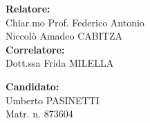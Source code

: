 \begin{titlepage}
\begin{minipage}[t]{0.47\textwidth}
  {\large{\bf{Relatore:}}\\Chiar.mo Prof. Federico Antonio\\ Niccolò Amadeo CABITZA}
  \vspace{0.5cm}
  {\large{\bf \\Correlatore:}\\ Dott.ssa Frida MILELLA}
\end{minipage}\hfill\begin{minipage}[t]{0.47\textwidth}\raggedleft
  {\large{\bf Candidato:} \\Umberto PASINETTI\\}
    {\large{Matr. n. 873604}}
\end{minipage}

\vspace{25mm}
\hrulefill
\\
\end{titlepage}